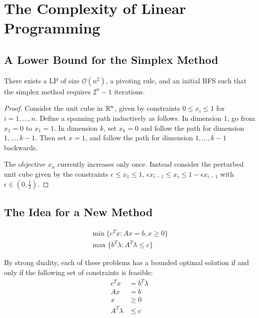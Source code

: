 
\chapter{The Complexity of Linear Programming}
\label{cha:compl-line-progr}

\section{A Lower Bound for the Simplex Method}
\label{sec:lower-bound-simplex}

\begin{thm}
  \label{defn:complexity_of_linear_programming:1}
  There exists a LP of size $\mathcal{O}(n^{2})$, a pivoting rule, and
  an initial BFS such that the simplex method requires $2^{n} - 1$ iterations.
\end{thm}

\begin{proof}
  Consider the unit cube in $\mathbb{R}^{n}$, given by constraints $0 \leq
  x_{i} \leq 1$ for $i = 1, \dots, n$.  Define a spanning path
  inductively as follows.  In dimension 1, go from $x_{1} = 0$ to
  $x_{1} = 1$.  In dimension $k$, set $x_{k} = 0$ and follow the path
  for dimension $1, \dots, k - 1$. Then set $x = 1$, and follow the
  path for dimension $1, \dots, k-1$ backwards.

  The objective $x_{n}$ currently increases only once.  Instead
  consider the perturbed unit cube given by the constraints $\epsilon
  \leq x_{1} \leq 1$, $\epsilon x_{i-1} \leq x_{i} \leq 1 - \epsilon
  x_{i-1}$ with $\epsilon \in (0, \frac{1}{2})$.
\end{proof}

\section{The Idea for a New Method}
\label{sec:idea-new-method}

\begin{align}
  \label{eq:29}
  \min \{ c^{T} x : Ax = b, x \geq 0 \} \\
  \max \{ b^{T} \lambda: A^{T} \lambda \leq c \}
\end{align}

By strong duality, each of these problems has a bounded optimal
solution if and only if the following set of constraints is feasible:
\begin{align}
  \label{eq:30}
  c^{T} x      & = b^{T} \lambda \\
  Ax           & = b             \\
  x            & \geq 0          \\
  A^{T}\lambda & \leq c
\end{align}

